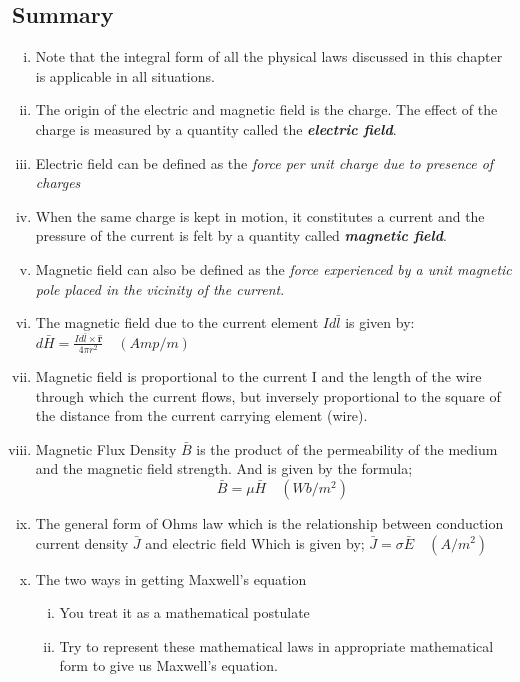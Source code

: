 \begin{mdframed}[backgroundcolor=lightblue, linewidth=1pt, hidealllines=true]
\section{Summary}
\begin{enumerate}[(i)]
	\item Note that the integral form of all the physical laws discussed in this chapter is applicable in all situations.
	
	\item The origin of the electric and magnetic field is the charge. The effect of the charge is measured by a quantity called the \textbf{\emph{electric field}}.
	
	\item Electric field can be defined as the \emph{force per unit charge due to presence of charges} 
	
	\item When the same charge is kept in motion, it constitutes a current and the pressure of the current is felt by a quantity called \textbf{\emph{magnetic field}}.
	
	\item Magnetic field can also be defined as the \emph{force experienced by a unit magnetic pole placed in the vicinity of the current}.
	
	\item The magnetic field due to the current element $Id\bar{l}$ is given by:
	$\boxed{d\bar{H}= \frac{Id\bar{l} \times \hat{\textbf{r}}}{4\pi r^{2}}}\quad (Amp/m)$ 
	
	\item Magnetic field is proportional to the current I and the length of the wire through which the current flows, but inversely proportional to the square of the distance from the current carrying element (wire).
	
	\item Magnetic Flux Density $\bar{B}$ is the product of the permeability of the medium and the magnetic field strength. And is given by the formula;
	$$\quad\boxed{\bar{B} = \mu\bar{H}}\quad (Wb/m^{2})$$
	
	\item The general form of Ohms law which is the relationship between conduction current density $\bar{J}$ and electric field Which is given by; $\boxed{\bar{J} = \sigma\bar{E}}\quad (A/m^{2})$
	
	\item The two ways in getting Maxwell's equation
	\begin{enumerate}[(i)]
		\item	You treat it as a mathematical postulate
		\item	Try to represent these mathematical laws in appropriate mathematical form to give us Maxwell's equation.
	\end{enumerate}
	

\end{enumerate}
\end{mdframed}
